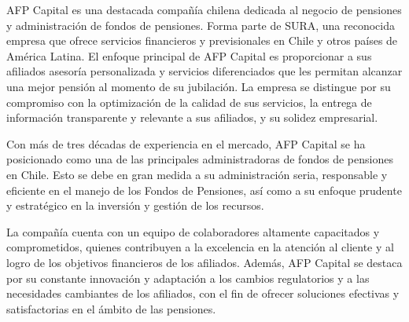 AFP Capital es una destacada compañía chilena dedicada al negocio de pensiones y administración de fondos de pensiones. Forma parte de SURA, una reconocida empresa que ofrece servicios financieros y previsionales en Chile y otros países de América Latina. El enfoque principal de AFP Capital es proporcionar a sus afiliados asesoría personalizada y servicios diferenciados que les permitan alcanzar una mejor pensión al momento de su jubilación. La empresa se distingue por su compromiso con la optimización de la calidad de sus servicios, la entrega de información transparente y relevante a sus afiliados, y su solidez empresarial.

Con más de tres décadas de experiencia en el mercado, AFP Capital se ha posicionado como una de las principales administradoras de fondos de pensiones en Chile. Esto se debe en gran medida a su administración seria, responsable y eficiente en el manejo de los Fondos de Pensiones, así como a su enfoque prudente y estratégico en la inversión y gestión de los recursos.

La compañía cuenta con un equipo de colaboradores altamente capacitados y comprometidos, quienes contribuyen a la excelencia en la atención al cliente y al logro de los objetivos financieros de los afiliados. Además, AFP Capital se destaca por su constante innovación y adaptación a los cambios regulatorios y a las necesidades cambiantes de los afiliados, con el fin de ofrecer soluciones efectivas y satisfactorias en el ámbito de las pensiones.
